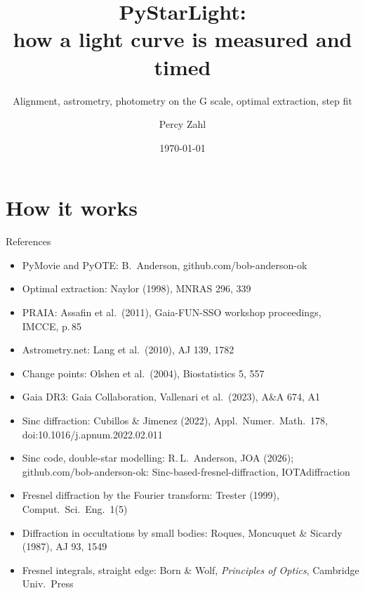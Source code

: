 \documentclass[aspectratio=169,11pt]{beamer}
\title{PyStarLight:\\ how a light curve is measured and timed}
\subtitle{Alignment, astrometry, photometry on the G scale, optimal extraction, step fit}
\author{Percy Zahl}
\institute{\faGithub\ \href{https://github.com/pyzahl/PyStarLight}{github.com/pyzahl/PyStarLight}\\[0.3ex]
  For PyStarLight version \pyversion}
\date{\today}
\begin{document}
\maketitle

\section{How it works}


\begin{frame}{References}
  \footnotesize
  \begin{itemize}\setlength{\itemsep}{0.4ex}
    \item PyMovie and PyOTE: B.~Anderson, github.com/bob-anderson-ok
    \item Optimal extraction: Naylor (1998), MNRAS 296, 339
    \item PRAIA: Assafin et al.\ (2011), Gaia-FUN-SSO workshop proceedings, IMCCE, p.\,85
    \item Astrometry.net: Lang et al.\ (2010), AJ 139, 1782
    \item Change points: Olshen et al.\ (2004), Biostatistics 5, 557
    \item Gaia DR3: Gaia Collaboration, Vallenari et al.\ (2023), A\&A 674, A1
    \item Sinc diffraction: Cubillos \& Jimenez (2022), Appl.\ Numer.\ Math.\ 178,\\ doi:10.1016/j.apnum.2022.02.011
    \item Sinc code, double-star modelling: R.\,L.~Anderson, JOA (2026);\\ github.com/bob-anderson-ok: Sinc-based-fresnel-diffraction, IOTAdiffraction
    \item Fresnel diffraction by the Fourier transform: Trester (1999), Comput.\ Sci.\ Eng.\ 1(5)
    \item Diffraction in occultations by small bodies: Roques, Moncuquet \& Sicardy (1987), AJ 93, 1549
    \item Fresnel integrals, straight edge: Born \& Wolf, \emph{Principles of Optics}, Cambridge Univ.\ Press
  \end{itemize}
\end{frame}
\end{document}
